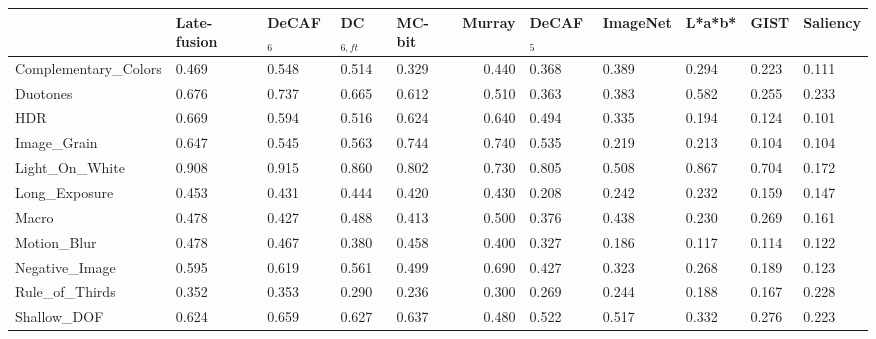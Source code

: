 \begin{tabular}{lllllrlllll}
\toprule
{} & Late-fusion & DeCAF$_6$ & DC$_{6, ft}$ & MC-bit &  Murray & DeCAF$_5$ & ImageNet & L*a*b* & GIST & Saliency \\
\midrule
Complementary\_Colors &                 0.469 &   0.548 &              0.514 &  0.329 &             0.440 &   0.368 &           0.389 &            0.294 & 0.223 &                0.111 \\
Duotones             &                 0.676 &   0.737 &              0.665 &  0.612 &             0.510 &   0.363 &           0.383 &            0.582 & 0.255 &                0.233 \\
HDR                  &                 0.669 &   0.594 &              0.516 &  0.624 &             0.640 &   0.494 &           0.335 &            0.194 & 0.124 &                0.101 \\
Image\_Grain          &                 0.647 &   0.545 &              0.563 &  0.744 &             0.740 &   0.535 &           0.219 &            0.213 & 0.104 &                0.104 \\
Light\_On\_White       &                 0.908 &   0.915 &              0.860 &  0.802 &             0.730 &   0.805 &           0.508 &            0.867 & 0.704 &                0.172 \\
Long\_Exposure        &                 0.453 &   0.431 &              0.444 &  0.420 &             0.430 &   0.208 &           0.242 &            0.232 & 0.159 &                0.147 \\
Macro                &                 0.478 &   0.427 &              0.488 &  0.413 &             0.500 &   0.376 &           0.438 &            0.230 & 0.269 &                0.161 \\
Motion\_Blur          &                 0.478 &   0.467 &              0.380 &  0.458 &             0.400 &   0.327 &           0.186 &            0.117 & 0.114 &                0.122 \\
Negative\_Image       &                 0.595 &   0.619 &              0.561 &  0.499 &             0.690 &   0.427 &           0.323 &            0.268 & 0.189 &                0.123 \\
Rule\_of\_Thirds       &                 0.352 &   0.353 &              0.290 &  0.236 &             0.300 &   0.269 &           0.244 &            0.188 & 0.167 &                0.228 \\
Shallow\_DOF          &                 0.624 &   0.659 &              0.627 &  0.637 &             0.480 &   0.522 &           0.517 &            0.332 & 0.276 &                0.223 \\

\end{tabular}
